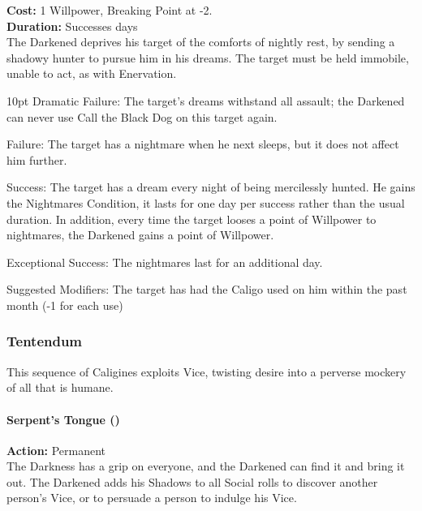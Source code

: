 \noindent \textbf{Cost:} 1 Willpower, Breaking Point at -2.\\

\noindent \textbf{Duration:} Successes days \\

\noindent The Darkened deprives his target of the comforts of nightly rest, by sending a shadowy hunter to pursue him in his dreams. The target must be held immobile, unable to act, as with Enervation.

   \begin{myindentpar}{10pt} Dramatic Failure: The target's dreams withstand all assault; the Darkened can never use Call the Black Dog on this target again.
    
    Failure: The target has a nightmare when he next sleeps, but it does not affect him further.
    
    Success: The target has a dream every night of being mercilessly hunted. He gains the Nightmares Condition, it lasts for one day per success rather than the usual duration. In addition, every time the target looses a point of Willpower to nightmares, the Darkened gains a point of Willpower. 
    
    Exceptional Success: The nightmares last for an additional day. 

Suggested Modifiers: The target has had the Caligo used on him within the past month (-1 for each use)\end{myindentpar}

\subsubsection*{Tentendum}

This sequence of Caligines exploits Vice, twisting desire into a perverse mockery of all that is humane. \\

\paragraph*{Serpent's Tongue (\textbullet)} 

\noindent \textbf{Action:} Permanent\\

\noindent The Darkness has a grip on everyone, and the Darkened can find it and bring it out. The Darkened adds his Shadows to all Social rolls to discover another person's Vice, or to persuade a person to indulge his Vice.\\

